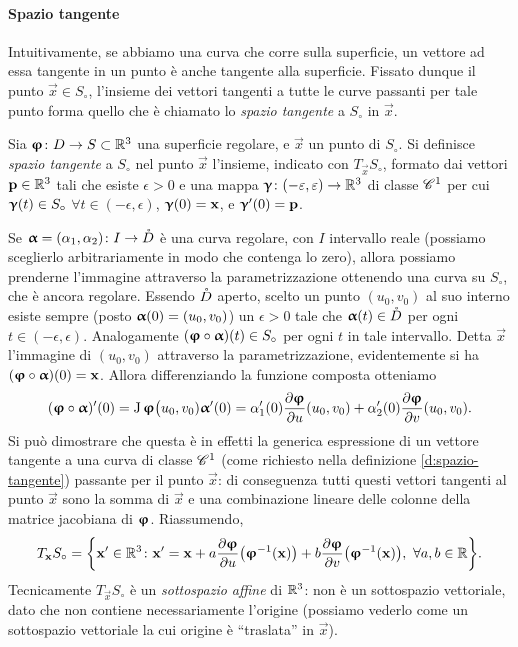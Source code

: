\paragraph{Spazio tangente}
Intuitivamente, se abbiamo una curva che corre sulla superficie, un vettore ad essa tangente in un punto è anche tangente alla superficie.
Fissato dunque il punto $\vec x\in S_\circ$, l'insieme dei vettori tangenti a tutte le curve passanti per tale punto forma quello che è chiamato lo \emph{spazio tangente} a $S_\circ$ in $\vec x$.
\begin{definizione} \label{d:spazio-tangente}
	Sia $\vphi\colon D\to S\subset\R^3$ una superficie regolare, e $\vec x$ un punto di $S_\circ$.
	Si definisce \emph{spazio tangente} a $S_\circ$ nel punto $\vec x$ l'insieme, indicato con $T_{\vec x}S_\circ$, formato dai vettori $\vec p\in\R^3$ tali che esiste $\epsilon>0$ e una mappa $\vgamma\colon(-\epsilon,\epsilon)\to\R^3$ di classe $\cclass[1]$ per cui $\vgamma(t)\in S_\circ$ $\forall t\in(-\epsilon,\epsilon)$, $\vgamma(0)=\vec x$, e $\vgamma'(0)=\vec p$.
\end{definizione}
Se $\valpha=(\alpha_1,\alpha_2)\colon I\to\interior{D}$ è una curva regolare, con $I$ intervallo reale (possiamo sceglierlo arbitrariamente in modo che contenga lo zero), allora possiamo prenderne l'immagine attraverso la parametrizzazione ottenendo una curva su $S_\circ$, che è ancora regolare.
Essendo $\interior{D}$ aperto, scelto un punto $(u_0,v_0)$ al suo interno esiste sempre (posto $\valpha(0)=(u_0,v_0)$) un $\epsilon>0$ tale che $\valpha(t)\in\interior{D}$ per ogni $t\in(-\epsilon,\epsilon)$.
Analogamente $(\vphi\circ\valpha)(t)\in S_\circ$ per ogni $t$ in tale intervallo.
Detta $\vec x$ l'immagine di $(u_0,v_0)$ attraverso la parametrizzazione, evidentemente si ha $(\vphi\circ\valpha)(0)=\vec x$.
Allora differenziando la funzione composta otteniamo
\begin{equation}
	(\vphi\circ\valpha)'(0)=\jac\vphi\big(u_0,v_0)\valpha'(0)=\alpha_1'(0)\drp{\vphi}{u}(u_0,v_0)+\alpha_2'(0)\drp{\vphi}{v}(u_0,v_0).
\end{equation}
Si può dimostrare che questa è in effetti la generica espressione di un vettore tangente a una curva di classe $\cclass[1]$ (come richiesto nella definizione \ref{d:spazio-tangente}) passante per il punto $\vec x$: di conseguenza tutti questi vettori tangenti al punto $\vec x$ sono la somma di $\vec x$ e una combinazione lineare delle colonne della matrice jacobiana di $\vphi$.
Riassumendo,
\begin{equation}
	T_{\vec x}S_\circ=\bigg\{\vec x'\in\R^3\colon \vec x'=\vec x+a\drp{\vphi}{u}\big(\vphi^{-1}(\vec x)\big)+b\drp{\vphi}{v}\big(\vphi^{-1}(\vec x)\big),\ \forall a,b\in\R\bigg\}.
	\label{eq:spazio-tangente}
\end{equation}
Tecnicamente $T_{\vec x}S_\circ$ è un \emph{sottospazio affine} di $\R^3$: non è un sottospazio vettoriale, dato che non contiene necessariamente l'origine (possiamo vederlo come un sottospazio vettoriale la cui origine è ``traslata'' in $\vec x$).

